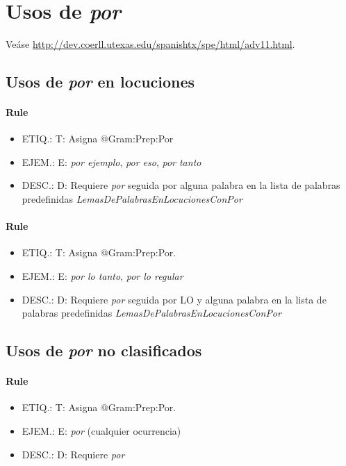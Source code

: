 \documentclass[11pt]{report}
\begin{document}
\section{Usos de \emph{por}}
Veáse \url{http://dev.coerll.utexas.edu/spanishtx/spe/html/adv11.html}.

\subsection{Usos de \emph{por} en locuciones}
\paragraph*{Rule}
\begin{itemize}
\item ETIQ.:  T: Asigna @Gram:Prep:Por
\item EJEM.:  E: \emph{por ejemplo}, \emph{por eso}, \emph{por tanto}
\item DESC.:  D: Requiere \emph{por} seguida por alguna palabra en la lista de palabras predefinidas \emph{LemasDePalabrasEnLocucionesConPor}
\end{itemize}

\paragraph*{Rule}
\begin{itemize}
\item ETIQ.:  T: Asigna @Gram:Prep:Por.
\item EJEM.:  E: \emph{por lo tanto}, \emph{por lo regular}
\item DESC.:  D: Requiere \emph{por} seguida por LO y alguna palabra en la lista de palabras predefinidas \emph{LemasDePalabrasEnLocucionesConPor}
\end{itemize}

\subsection{Usos de \emph{por} no clasificados}
\paragraph*{Rule}
\begin{itemize}
\item ETIQ.:  T: Asigna @Gram:Prep:Por.
\item EJEM.:  E: \emph{por} (cualquier ocurrencia)
\item DESC.:  D: Requiere \emph{por}
\end{itemize}
\end{document}
